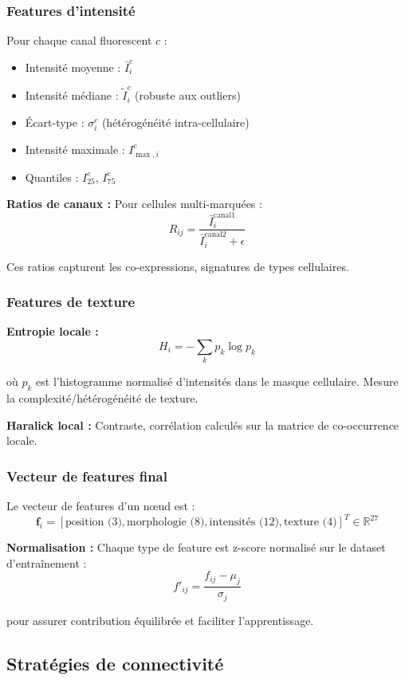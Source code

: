 \subsubsection{Features d'intensité}

Pour chaque canal fluorescent $c$ :
\begin{itemize}
    \item Intensité moyenne : $\bar{I}_i^c$
    \item Intensité médiane : $\tilde{I}_i^c$ (robuste aux outliers)
    \item Écart-type : $\sigma_i^c$ (hétérogénéité intra-cellulaire)
    \item Intensité maximale : $I_{\max,i}^c$
    \item Quantiles : $I_{25}^c$, $I_{75}^c$
\end{itemize}

\textbf{Ratios de canaux :}
Pour cellules multi-marquées :
\[
R_{ij} = \frac{\bar{I}_i^{\text{canal1}}}{\bar{I}_i^{\text{canal2}} + \epsilon}
\]

Ces ratios capturent les co-expressions, signatures de types cellulaires.

\subsubsection{Features de texture}

\textbf{Entropie locale :}
\[
H_i = -\sum_k p_k \log p_k
\]

où $p_k$ est l'histogramme normalisé d'intensités dans le masque cellulaire. Mesure la complexité/hétérogénéité de texture.

\textbf{Haralick local :}
Contraste, corrélation calculés sur la matrice de co-occurrence locale.

\subsubsection{Vecteur de features final}

Le vecteur de features d'un nœud est :
\[
\mathbf{f}_i = [\text{position (3)}, \text{morphologie (8)}, \text{intensités (12)}, \text{texture (4)}]^T \in \mathbb{R}^{27}
\]

\textbf{Normalisation :}
Chaque type de feature est z-score normalisé sur le dataset d'entraînement :
\[
f'_{ij} = \frac{f_{ij} - \mu_j}{\sigma_j}
\]

pour assurer contribution équilibrée et faciliter l'apprentissage.

\subsection{Stratégies de connectivité}

